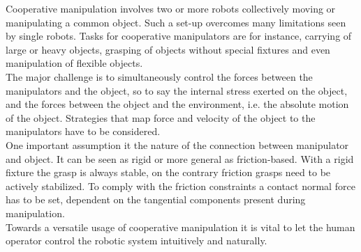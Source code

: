 \documentclass[a4paper,twoside, openright,12pt]{report}
\begin{document}
%
Cooperative manipulation involves two or more robots collectively moving or manipulating a common object. Such a set-up overcomes many limitations seen by single robots. Tasks for cooperative manipulators are for instance, carrying of large or heavy objects, grasping of objects without special fixtures and even manipulation of flexible objects.\\
The major challenge is to simultaneously control the forces between the manipulators and the object, so to say the internal stress exerted on the object, and the forces between the object and the environment, i.e. the absolute motion of the object.
Strategies that map force and velocity of the object to the manipulators have to be considered.\\
One important assumption it the nature of the connection between manipulator and object. It can be seen as rigid or more general as friction-based. With a rigid fixture the grasp is always stable, on the contrary friction grasps need to be actively stabilized. To comply with the friction constraints a contact normal force has to be set, dependent on the tangential components present during manipulation.\\
Towards a versatile usage of cooperative manipulation it is vital to let the human operator control the robotic system intuitively and naturally. 
\end{document}
